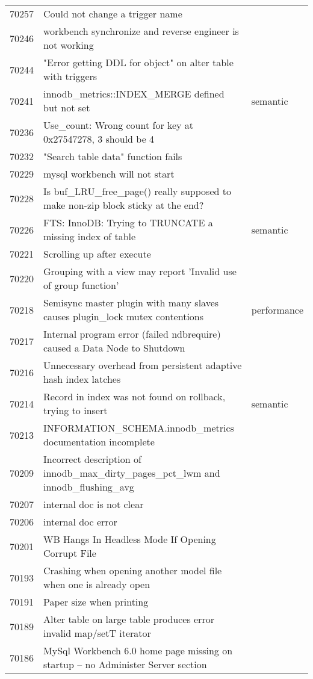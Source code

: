 \begin{longtable}[c]{p{1cm}p{10cm}p{1cm}}
70257 & Could not change a trigger name &  \\
70246 & workbench synchronize and reverse engineer is not working &  \\
70244 & "Error getting DDL for object" on alter table with triggers &  \\
70241 & innodb\_metrics::INDEX\_MERGE defined but not set & semantic \\
70236 & Use\_count: Wrong count for key at 0x27547278, 3 should be 4 &  \\
70232 & "Search table data" function fails &  \\
70229 & mysql workbench will not start &  \\
70228 & Is buf\_LRU\_free\_page() really supposed to make non-zip block sticky at the end? &  \\
70226 & FTS: InnoDB: Trying to TRUNCATE a missing index of table & semantic \\
70221 & Scrolling up after execute &  \\
70220 & Grouping with a view may report 'Invalid use of group function' &  \\
70218 & Semisync master plugin with many slaves causes plugin\_lock mutex contentions & performance \\
70217 & Internal program error (failed ndbrequire) caused a Data Node to Shutdown &  \\
70216 & Unnecessary overhead from persistent adaptive hash index latches &  \\
70214 & Record in index was not found on rollback, trying to insert & semantic \\
70213 & INFORMATION\_SCHEMA.innodb\_metrics documentation incomplete &  \\
70209 & Incorrect description of innodb\_max\_dirty\_pages\_pct\_lwm and innodb\_flushing\_avg &  \\
70207 & internal doc is not clear &  \\
70206 & internal doc error &  \\
70201 & WB Hangs In Headless Mode If Opening Corrupt File &  \\
70193 & Crashing when opening another model file when one is already open &  \\
70191 & Paper size when printing &  \\
70189 & Alter table on large table produces error invalid map/setT iterator &  \\
70186 & MySql Workbench 6.0 home page missing on startup -- no Administer Server section &  \\

\end{longtable}
